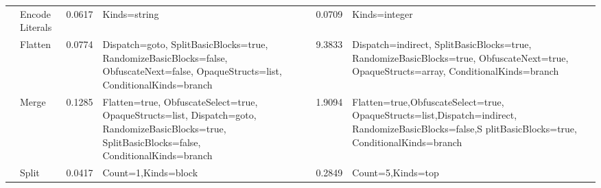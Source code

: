 \begin{table*}[p]
\begin{footnotesize}
\begin{tabular}{|p{1.5cm}|l|l|p{5cm}|l|p{5cm}|}
                                                                               & Encode Literals                                                        & 0.0617                                                    &  Kinds=string                                                                                                                                                                            & 0.0709                                                    &  Kinds=integer                                                                                                                                                                               \\ \cline{2-6} 
                                                                               & Flatten                                                                & 0.0774                                                    & \raggedright Dispatch=goto, SplitBasicBlocks=true, RandomizeBasicBlocks=false, ObfuscateNext=false, OpaqueStructs=list, ConditionalKinds=branch              & 9.3833                                                    &        Dispatch=indirect, SplitBasicBlocks=true, RandomizeBasicBlocks=true,  ObfuscateNext=true,  OpaqueStructs=array, ConditionalKinds=branch                \\ \cline{2-6} 
                                                                               & Merge                                                                  & 0.1285                                                    & 
                                                            Flatten=true, ObfuscateSelect=true, OpaqueStructs=list, Dispatch=goto,  RandomizeBasicBlocks=true, SplitBasicBlocks=false, ConditionalKinds=branch & 1.9094                                                    & Flatten=true,ObfuscateSelect=true, OpaqueStructs=list,Dispatch=indirect, RandomizeBasicBlocks=false,S plitBasicBlocks=true, ConditionalKinds=branch \\ \cline{2-6} 
                                                                               & Split                                                                  & 0.0417                                                    &  Count=1,Kinds=block                                                                                                                                                                     & 0.2849                                                    &  Count=5,Kinds=top                                                                                                                                                                           \\ \cline{2-6} 

\end{tabular}
\end{footnotesize}
\end{table*}
